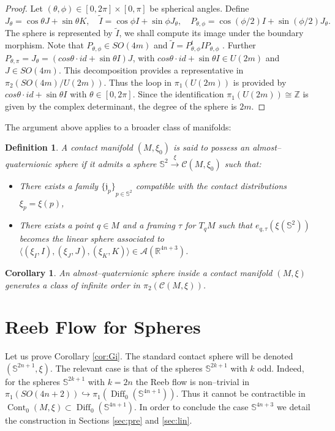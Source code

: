 \documentclass[10pt]{amsart}
\newtheorem{definition}[proposition]{Definition}
\newtheorem{corollary}[proposition]{Corollary}
\begin{document}
\begin{proof}
\noindent Let $(\theta,\phi)\in[0,2\pi]\times[0,\pi]$ be spherical angles. Define
$$J_\theta=\cos\theta J+\sin\theta K,\quad \widetilde{I}=\cos\phi I+\sin\phi J_\theta,\quad P_{\theta,\phi}=\cos(\phi/2)I+\sin(\phi/2)J_\theta.$$
The sphere is represented by $\widetilde{I}$, we shall compute its image under the boundary morphism. Note that $P_{\theta,\phi}\in SO(4m)$ and $\widetilde{I}=P_{\theta,\phi}^tIP_{\theta,\phi}$ . Further $P_{\theta,\pi}=J_\theta=(cos\theta\cdot id+\sin\theta I)J$, with $cos\theta\cdot id+\sin\theta I\in U(2m)$ and $J\in SO(4m)$. This decomposition provides a representative in $\pi_2(SO(4m)/U(2m))$. Thus the loop in $\pi_1(U(2m))$ is provided by $cos\theta\cdot id+\sin\theta I$ with $\theta\in[0,2\pi]$. Since the identification $\pi_1(U(2m))\cong{\mathbb{Z}}$ is given by the complex determinant, the degree of the sphere is $2m$.
\end{proof}
\noindent The argument above applies to a broader class of manifolds:
\begin{definition}
A contact manifold $(M,\xi_0)$ is said to possess an almost--quaternionic sphere if it admits a sphere ${\mathbb{S}}^2\stackrel{\xi}{\longrightarrow}{\mathcal{C}}(M,\xi_0)$ such that:
\begin{itemize}
\item[1)] There exists a family ${\{{\mathfrak{j}}_p\}}_{p\in{\mathbb{S}}^2}$ compatible with the contact distributions $\xi_p=\xi(p)$,
\item[2)] There exists a point $q\in M$ and a framing $\tau$ for $T_qM$ such that $e_{q,\tau}(\xi({\mathbb{S}}^2))$ becomes the linear sphere associated to $\langle(\xi_I,I),(\xi_J,J),(\xi_K,K)\rangle\in{\mathcal{A}}({\mathbb{R}}^{4n+3})$.
\end{itemize}
\end{definition}
\begin{corollary}
An almost--quaternionic sphere inside a contact manifold $(M,\xi)$ generates a class of infinite order in $\pi_2({\mathcal{C}}(M,\xi))$.
\end{corollary}
\section{Reeb Flow for Spheres}\label{sec:gi}

\noindent Let us prove Corollary \ref{cor:Gi}. The standard contact sphere will be denoted $({\mathbb{S}}^{2n+1},\xi)$. The relevant case is that of the spheres ${\mathbb{S}}^{2k+1}$ with $k$ odd. Indeed, for the spheres ${\mathbb{S}}^{2k+1}$ with $k=2n$ the Reeb flow is non--trivial in $\pi_1(SO(4n+2))\hookrightarrow\pi_1({\operatorname{Diff}}_0({\mathbb{S}}^{4n+1}))$. Thus it cannot be contractible in ${\operatorname{Cont}}_0(M,\xi)\subset{\operatorname{Diff}}_0({\mathbb{S}}^{4n+1})$. In order to conclude the case ${\mathbb{S}}^{4n+3}$ we detail the construction in Sections \ref{sec:pre} and \ref{sec:lin}.\\
\end{document}
